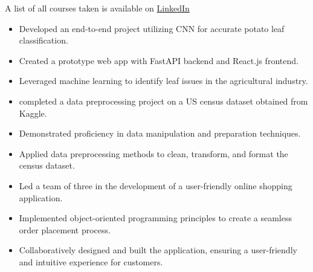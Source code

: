 \documentclass[10pt,a4paper,ragged2e,withhyper]{altacv}
\begin{document}
\begin{paracol}{2}



A list of all courses taken is available on \href{https://www.linkedin.com/in/mahasnain/details/courses/}{LinkedIn}

\divider



\begin{itemize}
\item Developed an end-to-end project utilizing CNN for accurate potato leaf classification.
\item Created a prototype web app with FastAPI backend and React.js frontend.
\item Leveraged machine learning to identify leaf issues in the agricultural industry.
\end{itemize}

\divider
{}
\begin{itemize}
\item completed a data preprocessing project on a US census dataset obtained from Kaggle.
\item Demonstrated proficiency in data manipulation and preparation techniques.
\item Applied data preprocessing methods to clean, transform, and format the census dataset.
\end{itemize}

\divider
{}
\begin{itemize}
\item Led a team of three in the development of a user-friendly online shopping application.
\item Implemented object-oriented programming principles to create a seamless order placement process.
\item Collaboratively designed and built the application, ensuring a user-friendly and intuitive experience for customers.
\end{itemize}


\end{paracol}
\end{document}
